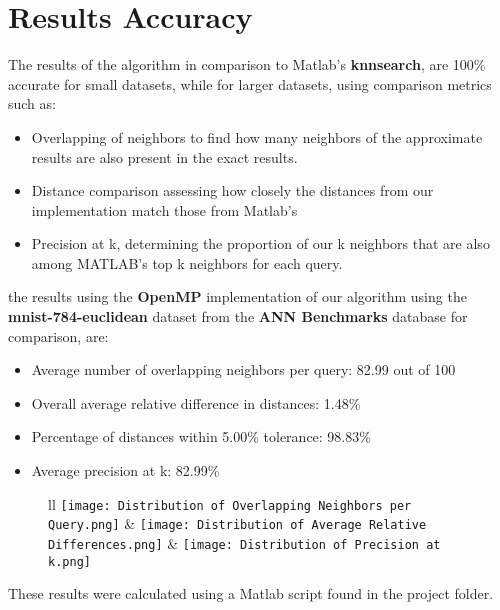 \documentclass[12pt]{report}
\begin{document}
\section{Results Accuracy}
The results of the algorithm in comparison to Matlab's \textbf{knnsearch}, are 100\% accurate for small datasets, while for larger datasets, using comparison metrics such as:
\begin{itemize}
    \item Overlapping of neighbors to find how many neighbors of the approximate results are also present in the exact results.
    \item Distance comparison assessing how closely the distances from our implementation match those from Matlab's
    \item Precision at k, determining the proportion of our k neighbors that are also among MATLAB's top k neighbors for each query.
\end{itemize}
the results using the \textbf{OpenMP} implementation of our algorithm using the \textbf{mnist-784-euclidean} dataset from the \textbf{ANN Benchmarks} database for comparison, are:
\begin{itemize}
    \item Average number of overlapping neighbors per query: 82.99 out of 100
    \item Overall average relative difference in distances: 1.48\%
    \item Percentage of distances within 5.00\% tolerance: 98.83\%
    \item Average precision at k: 82.99\%
\end{itemize}
\begin{figure}[h]
    \begin{tabular}{ll}
        \texttt{[image: Distribution of Overlapping Neighbors per Query.png]}
        &
        \texttt{[image: Distribution of Average Relative Differences.png]}
        &
        \texttt{[image: Distribution of Precision at k.png]}
    \end{tabular}
\end{figure}
These results were calculated using a Matlab script found in the project folder.
\newpage
\end{document}
